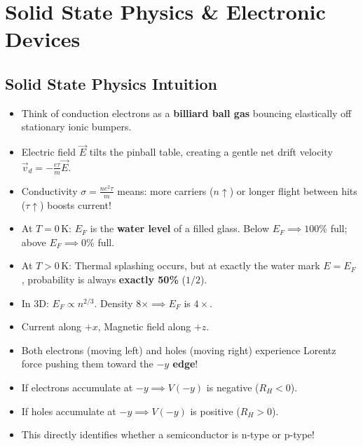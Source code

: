 \chapter{Solid State Physics \& Electronic Devices}

\section{Solid State Physics Intuition}
\begin{notebox}
\begin{itemize}[leftmargin=*]
    \item Think of conduction electrons as a \textbf{billiard ball gas} bouncing elastically off stationary ionic bumpers.
    \item Electric field $\vec{E}$ tilts the pinball table, creating a gentle net drift velocity $\vec{v}_d = -\frac{e\tau}{m}\vec{E}$.
    \item Conductivity $\sigma = \frac{ne^2\tau}{m}$ means: more carriers ($n\uparrow$) or longer flight between hits ($\tau\uparrow$) boosts current!
\end{itemize}
\end{notebox}

\begin{trickbox}
\begin{itemize}[leftmargin=*]
    \item At $T=0\,\text{K}$: $E_F$ is the \textbf{water level} of a filled glass. Below $E_F \implies 100\%$ full; above $E_F \implies 0\%$ full.
    \item At $T > 0\,\text{K}$: Thermal splashing occurs, but at exactly the water mark $E=E_F$, probability is always \textbf{exactly 50\%} ($1/2$).
    \item In 3D: $E_F \propto n^{2/3}$. Density $8\times \implies E_F$ is $4\times$.
\end{itemize}
\end{trickbox}

\begin{notebox}
\begin{itemize}[leftmargin=*]
    \item Current along $+x$, Magnetic field along $+z$.
    \item Both electrons (moving left) and holes (moving right) experience Lorentz force pushing them toward the \textbf{$-y$ edge}!
    \item If electrons accumulate at $-y \implies V(-y)$ is negative ($R_H < 0$).
    \item If holes accumulate at $-y \implies V(-y)$ is positive ($R_H > 0$).
    \item This directly identifies whether a semiconductor is n-type or p-type!
\end{itemize}
\end{notebox}

